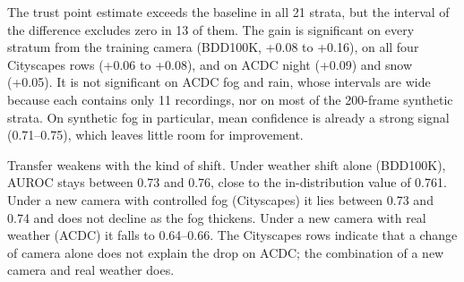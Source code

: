 \documentclass[pdflatex,sn-mathphys-num]{sn-jnl}
\begin{document}
The trust point estimate exceeds the baseline in all 21 strata, but the interval of the difference excludes zero in 13 of them. The gain is significant on every stratum from the training camera (BDD100K, +0.08 to +0.16), on all four Cityscapes rows (+0.06 to +0.08), and on ACDC night (+0.09) and snow (+0.05). It is not significant on ACDC fog and rain, whose intervals are wide because each contains only 11 recordings, nor on most of the 200-frame synthetic strata. On synthetic fog in particular, mean confidence is already a strong signal (0.71--0.75), which leaves little room for improvement.

Transfer weakens with the kind of shift. Under weather shift alone (BDD100K), AUROC stays between 0.73 and 0.76, close to the in-distribution value of 0.761. Under a new camera with controlled fog (Cityscapes) it lies between 0.73 and 0.74 and does not decline as the fog thickens. Under a new camera with real weather (ACDC) it falls to 0.64--0.66. The Cityscapes rows indicate that a change of camera alone does not explain the drop on ACDC; the combination of a new camera and real weather does.
\end{document}

